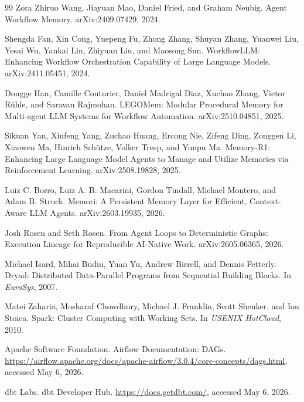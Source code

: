 \documentclass{article}
\begin{document}
\begin{thebibliography}{99}
Zora Zhiruo Wang, Jiayuan Mao, Daniel Fried, and Graham Neubig.
\newblock Agent Workflow Memory.
\newblock arXiv:2409.07429, 2024.

Shengda Fan, Xin Cong, Yuepeng Fu, Zhong Zhang, Shuyan Zhang, Yuanwei Liu, Yesai Wu, Yankai Lin, Zhiyuan Liu, and Maosong Sun.
\newblock WorkflowLLM: Enhancing Workflow Orchestration Capability of Large Language Models.
\newblock arXiv:2411.05451, 2024.

Dongge Han, Camille Couturier, Daniel Madrigal Diaz, Xuchao Zhang, Victor R\"uhle, and Saravan Rajmohan.
\newblock LEGOMem: Modular Procedural Memory for Multi-agent LLM Systems for Workflow Automation.
\newblock arXiv:2510.04851, 2025.

Sikuan Yan, Xiufeng Yang, Zuchao Huang, Ercong Nie, Zifeng Ding, Zonggen Li, Xiaowen Ma, Hinrich Sch\"utze, Volker Tresp, and Yunpu Ma.
\newblock Memory-R1: Enhancing Large Language Model Agents to Manage and Utilize Memories via Reinforcement Learning.
\newblock arXiv:2508.19828, 2025.

Luiz C. Borro, Luiz A. B. Macarini, Gordon Tindall, Michael Montero, and Adam B. Struck.
\newblock Memori: A Persistent Memory Layer for Efficient, Context-Aware LLM Agents.
\newblock arXiv:2603.19935, 2026.

Josh Rosen and Seth Rosen.
\newblock From Agent Loops to Deterministic Graphs: Execution Lineage for Reproducible AI-Native Work.
\newblock arXiv:2605.06365, 2026.

Michael Isard, Mihai Budiu, Yuan Yu, Andrew Birrell, and Dennis Fetterly.
\newblock Dryad: Distributed Data-Parallel Programs from Sequential Building Blocks.
\newblock In \emph{EuroSys}, 2007.

Matei Zaharia, Mosharaf Chowdhury, Michael J. Franklin, Scott Shenker, and Ion Stoica.
\newblock Spark: Cluster Computing with Working Sets.
\newblock In \emph{USENIX HotCloud}, 2010.

Apache Software Foundation.
\newblock Airflow Documentation: DAGs.
\newblock \url{https://airflow.apache.org/docs/apache-airflow/3.0.4/core-concepts/dags.html}, accessed May 6, 2026.

dbt Labs.
\newblock dbt Developer Hub.
\newblock \url{https://docs.getdbt.com/}, accessed May 6, 2026.


\end{thebibliography}
\end{document}
